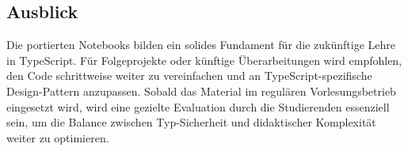 \subsection{Ausblick}
Die portierten Notebooks bilden ein solides Fundament für die zukünftige Lehre in TypeScript. Für Folgeprojekte oder künftige Überarbeitungen wird empfohlen, den Code schrittweise weiter zu vereinfachen und an TypeScript-spezifische Design-Pattern anzupassen. Sobald das Material im regulären Vorlesungsbetrieb eingesetzt wird, wird eine gezielte Evaluation durch die Studierenden essenziell sein, um die Balance zwischen Typ-Sicherheit und didaktischer Komplexität weiter zu optimieren.